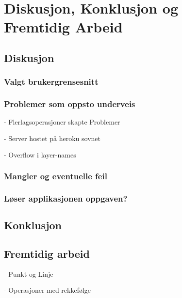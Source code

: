 \chapter{Diskusjon, Konklusjon og Fremtidig Arbeid}

\section{Diskusjon}

\subsection{Valgt brukergrensesnitt}

\subsection{Problemer som oppsto underveis}

- Flerlagsoperasjoner skapte Problemer

- Server hostet på heroku sovnet

- Overflow i layer-names

\subsection{Mangler og eventuelle feil}

\subsection{Løser applikasjonen oppgaven?}

\section{Konklusjon}

\section{Fremtidig arbeid}

- Punkt og Linje

- Operasjoner med rekkefølge